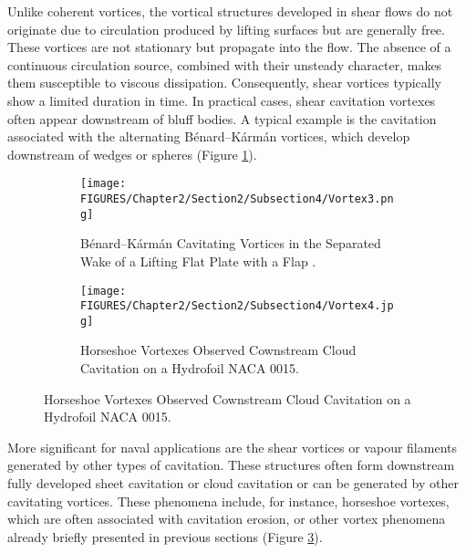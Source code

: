 Unlike coherent vortices, the vortical structures developed in shear flows do not originate due to circulation produced by lifting surfaces but are generally free. These vortices are not stationary but propagate into the flow. The absence of a continuous circulation source, combined with their unsteady character, makes them susceptible to viscous dissipation. Consequently, shear vortices typically show a limited duration in time.
In practical cases, shear cavitation vortexes often appear downstream of bluff bodies. A typical example is the cavitation associated with the alternating Bénard–Kármán vortices, which develop downstream of wedges or spheres (Figure \ref{fig:BKvortex}). 

\begin{figure}[htbp]
    \centering
    \begin{subfigure}[b]{0.47\textwidth}
        \centering
        \texttt{[image: FIGURES/Chapter2/Section2/Subsection4/Vortex3.png]}
        \caption{Bénard–Kármán Cavitating Vortices in the Separated Wake of a Lifting Flat Plate with a Flap \cite{brennen2014cavitation}.}
        \label{fig:BKvortex}
    \end{subfigure}
    \hfill
    \begin{subfigure}[b]{0.47\textwidth}
        \centering
        \texttt{[image: FIGURES/Chapter2/Section2/Subsection4/Vortex4.jpg]}
        \caption{Horseshoe Vortexes Observed Cownstream Cloud Cavitation on a Hydrofoil NACA 0015.}
        \label{fig:Horse}
    \end{subfigure}
\end{figure}

More significant for naval applications are the shear vortices or vapour filaments generated by other types of cavitation. These structures often form downstream fully developed sheet cavitation or cloud cavitation or can be generated by other cavitating vortices.
These phenomena include, for instance, horseshoe vortexes, which are often associated with cavitation erosion, or other vortex phenomena already briefly presented in previous sections (Figure \ref{fig:Horse}). 
